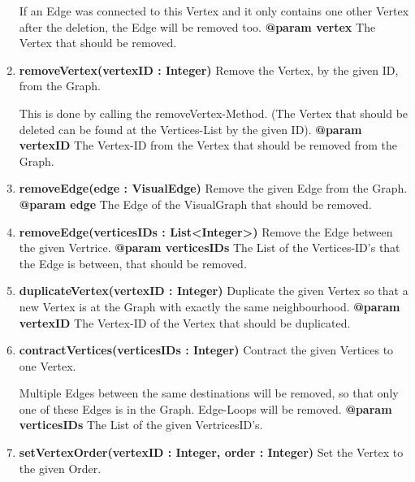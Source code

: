 \begin{enumerate}[+]
{						If an Edge was connected to this Vertex and it only contains one other Vertex after the deletion, the Edge will be removed too.
						\newline
						\textbf{@param vertex}
							The Vertex that should be removed.
							\newline
					}
					\item{
						\textbf{removeVertex(vertexID : Integer)} \newline
						Remove the Vertex, by the given ID, from the Graph.
						
						This is done by calling the removeVertex-Method.
						(The Vertex that should be deleted can be found at the Vertices-List by the given ID).
						\newline
						\textbf{@param vertexID}
							The Vertex-ID from the Vertex that should be removed from the Graph.
							\newline
					}
					\item{
						\textbf{removeEdge(edge : VisualEdge)} \newline
						Remove the given Edge from the Graph.
						\newline
						\textbf{@param edge}
							The Edge of the VisualGraph that should be removed.
							\newline
					}
					\item{
						\textbf{removeEdge(verticesIDs : List<Integer>)} \newline
						Remove the Edge between the given Vertrice.
						\newline
						\textbf{@param verticesIDs}
							The List of the Vertices-ID's that the Edge is between, that should be removed.
							\newline
					}
					\item{
						\textbf{duplicateVertex(vertexID : Integer)} \newline
						Duplicate the given Vertex so that a new Vertex is at the Graph with exactly the same neighbourhood.
						\newline
						\textbf{@param vertexID}
							The Vertex-ID of the Vertex that should be duplicated.
							\newline
					}
					\item{
						\textbf{contractVertices(verticesIDs : Integer)} \newline
						Contract the given Vertices to one Vertex.
						
						Multiple Edges between the same destinations will be removed, so that only one of these Edges is in the Graph.
						Edge-Loops will be removed.
						\newline
						\textbf{@param verticesIDs}
							The List of the given VertricesID's.
							\newline
					}
					\item{
						\textbf{setVertexOrder(vertexID : Integer, order : Integer)} \newline
						Set the Vertex to the given Order.
						
}
\end{enumerate}
